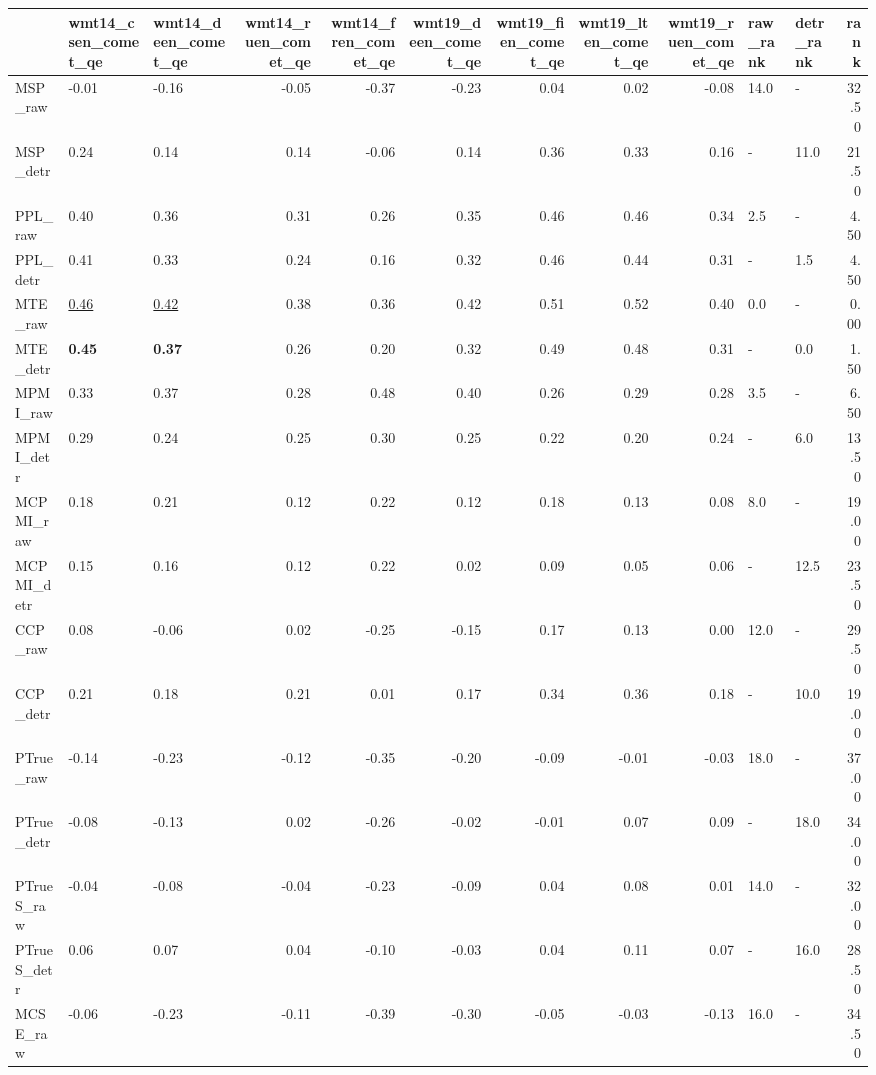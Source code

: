 \begin{tabular}{lllrrrrrrllr}
\toprule
\midrule
 & wmt14\_csen\_comet\_qe & wmt14\_deen\_comet\_qe & wmt14\_ruen\_comet\_qe & wmt14\_fren\_comet\_qe & wmt19\_deen\_comet\_qe & wmt19\_fien\_comet\_qe & wmt19\_lten\_comet\_qe & wmt19\_ruen\_comet\_qe & raw\_rank & detr\_rank & rank \\
\midrule
\midrule
MSP\_raw & -0.01 & -0.16 & -0.05 & -0.37 & -0.23 & 0.04 & 0.02 & -0.08 & 14.0 & - & 32.50 \\
MSP\_detr & 0.24 & 0.14 & 0.14 & -0.06 & 0.14 & 0.36 & 0.33 & 0.16 & - & 11.0 & 21.50 \\
\midrule
PPL\_raw & 0.40 & 0.36 & 0.31 & 0.26 & 0.35 & 0.46 & 0.46 & 0.34 & 2.5 & - & 4.50 \\
PPL\_detr & 0.41 & 0.33 & 0.24 & 0.16 & 0.32 & 0.46 & 0.44 & 0.31 & - & 1.5 & 4.50 \\
\midrule
MTE\_raw & \underline{0.46} & \underline{0.42} & 0.38 & 0.36 & 0.42 & 0.51 & 0.52 & 0.40 & 0.0 & - & 0.00 \\
MTE\_detr & \textbf{0.45} & \textbf{0.37} & 0.26 & 0.20 & 0.32 & 0.49 & 0.48 & 0.31 & - & 0.0 & 1.50 \\
\midrule
MPMI\_raw & 0.33 & 0.37 & 0.28 & 0.48 & 0.40 & 0.26 & 0.29 & 0.28 & 3.5 & - & 6.50 \\
MPMI\_detr & 0.29 & 0.24 & 0.25 & 0.30 & 0.25 & 0.22 & 0.20 & 0.24 & - & 6.0 & 13.50 \\
\midrule
MCPMI\_raw & 0.18 & 0.21 & 0.12 & 0.22 & 0.12 & 0.18 & 0.13 & 0.08 & 8.0 & - & 19.00 \\
MCPMI\_detr & 0.15 & 0.16 & 0.12 & 0.22 & 0.02 & 0.09 & 0.05 & 0.06 & - & 12.5 & 23.50 \\
\midrule
CCP\_raw & 0.08 & -0.06 & 0.02 & -0.25 & -0.15 & 0.17 & 0.13 & 0.00 & 12.0 & - & 29.50 \\
CCP\_detr & 0.21 & 0.18 & 0.21 & 0.01 & 0.17 & 0.34 & 0.36 & 0.18 & - & 10.0 & 19.00 \\
\midrule
PTrue\_raw & -0.14 & -0.23 & -0.12 & -0.35 & -0.20 & -0.09 & -0.01 & -0.03 & 18.0 & - & 37.00 \\
PTrue\_detr & -0.08 & -0.13 & 0.02 & -0.26 & -0.02 & -0.01 & 0.07 & 0.09 & - & 18.0 & 34.00 \\
\midrule
PTrueS\_raw & -0.04 & -0.08 & -0.04 & -0.23 & -0.09 & 0.04 & 0.08 & 0.01 & 14.0 & - & 32.00 \\
PTrueS\_detr & 0.06 & 0.07 & 0.04 & -0.10 & -0.03 & 0.04 & 0.11 & 0.07 & - & 16.0 & 28.50 \\
\midrule
MCSE\_raw & -0.06 & -0.23 & -0.11 & -0.39 & -0.30 & -0.05 & -0.03 & -0.13 & 16.0 & - & 34.50 \\

\end{tabular}

